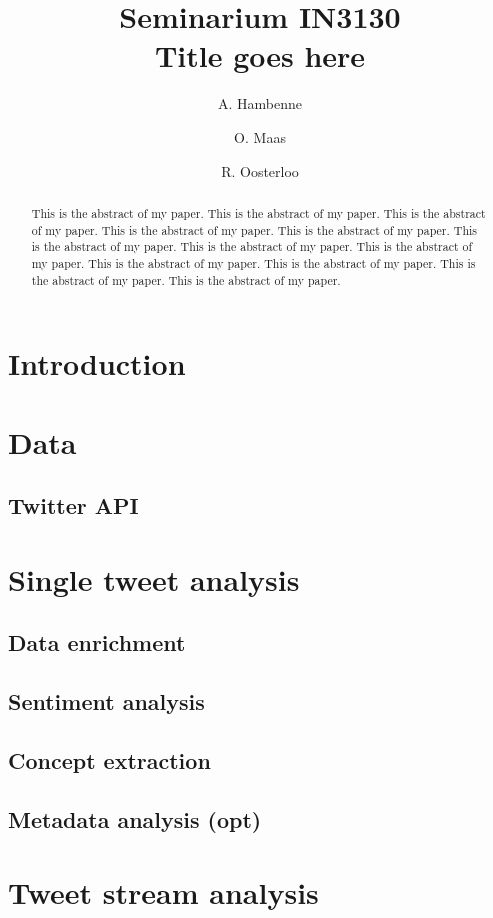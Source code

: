 \documentclass{article}
\title{Seminarium IN3130\\ Title goes here}
\author{A. Hambenne  \and
    O. Maas \and
    R. Oosterloo}
\date{}
\begin{document}
\maketitle
\thispagestyle{empty}

\begin{abstract}
This is the abstract of my paper.
This is the abstract of my paper.
This is the abstract of my paper.
This is the abstract of my paper.
This is the abstract of my paper.
This is the abstract of my paper.
This is the abstract of my paper.
This is the abstract of my paper.
This is the abstract of my paper.
This is the abstract of my paper.
This is the abstract of my paper.
This is the abstract of my paper.
\end{abstract}


\section{Introduction}


\section{Data}

\subsection{Twitter API}

\section{Single tweet analysis}
\subsection{Data enrichment}
\subsection{Sentiment analysis}
\subsection{Concept extraction}
\subsection{Metadata analysis (opt)}

\section{Tweet stream analysis}
\end{document}
